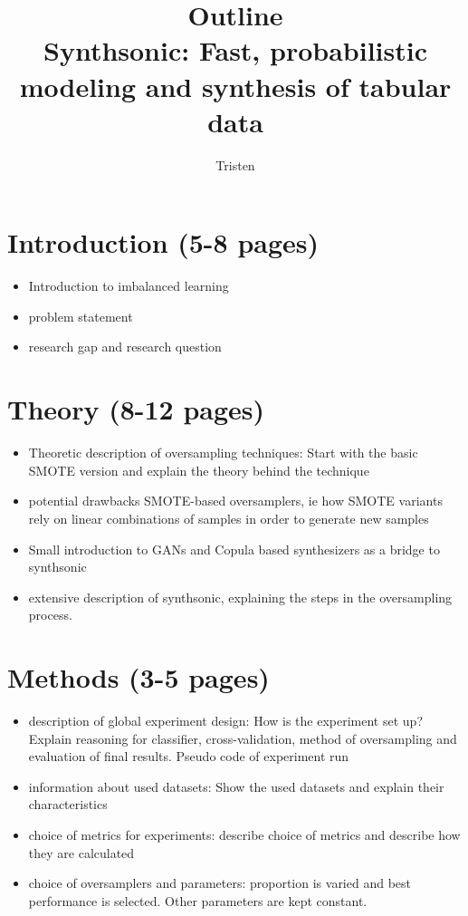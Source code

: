 \documentclass{article}
\author{Tristen}
\title{Outline \\ Synthsonic: Fast, probabilistic modeling and synthesis of tabular data}
\begin{document}
\maketitle

\section{Introduction (5-8 pages)}
    \begin{itemize}
        \item Introduction to imbalanced learning
        \item problem statement
        \item research gap and research question
    \end{itemize}

\section{Theory (8-12 pages)}
    \begin{itemize}
        \item Theoretic description of oversampling techniques: Start with the basic SMOTE version and explain the theory behind the technique
        \item potential drawbacks SMOTE-based oversamplers, ie how SMOTE variants rely on linear combinations of samples in order to generate new samples
        \item Small introduction to GANs and Copula based synthesizers as a bridge to synthsonic
        \item extensive description of synthsonic, explaining the steps in the oversampling process.
    \end{itemize}

\section{Methods (3-5 pages)}
    \begin{itemize}
        \item description of global experiment design: How is the experiment set up? Explain reasoning for classifier, cross-validation, method of oversampling and evaluation of final results. Pseudo code of experiment run
        \item information about used datasets: Show the used datasets and explain their characteristics
        \item choice of metrics for experiments: describe choice of metrics and describe how they are calculated
        \item choice of oversamplers and parameters: proportion is varied and best performance is selected. Other parameters are kept constant.
    \end{itemize}
    
\end{document}
